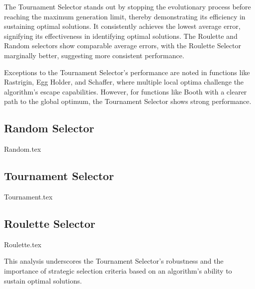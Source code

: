     The Tournament Selector stands out by stopping the evolutionary process before reaching the maximum generation 
    limit, thereby demonstrating its efficiency in sustaining optimal solutions. It consistently achieves the lowest 
    average error, signifying its effectiveness in identifying optimal solutions. The Roulette and Random selectors 
    show comparable average errors, with the Roulette Selector marginally better, suggesting more consistent 
    performance.
    
    Exceptions to the Tournament Selector's performance are noted in functions like Rastrigin, Egg Holder, and 
    Schaffer, where multiple local optima challenge the algorithm's escape capabilities. However, for functions like 
    Booth with a clearer path to the global optimum, the Tournament Selector shows strong performance.
    
    \begin{center}
        \subsection{Random Selector}
            {Random.tex}
        \subsection{Tournament Selector}
            {Tournament.tex}
        \subsection{Roulette Selector}
            {Roulette.tex}
    \end{center}
    
    This analysis underscores the Tournament Selector's robustness and the importance of strategic selection criteria 
    based on an algorithm's ability to sustain optimal solutions.